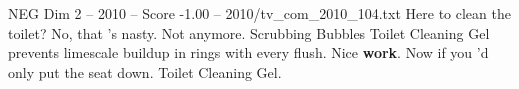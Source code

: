 \begin{textsample}{NEG Dim 2 – 2010 – Score -1.00 – 2010/tv\_com\_2010\_104.txt}  \label{ex:f2_neg_059}
Here to clean the toilet?
No, that 's nasty.
Not anymore.
Scrubbing Bubbles Toilet Cleaning Gel prevents limescale buildup in rings with every flush.
Nice \textbf{work}.
Now if you 'd only put the seat down.
Toilet Cleaning Gel.

\end{textsample}
